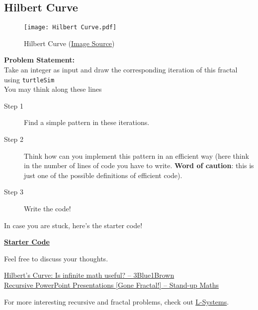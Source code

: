 \documentclass[../../Problems]{subfiles}
\begin{document}
\subsection{Hilbert Curve}{\label{pp:hilbertcurve}}
\begin{figure}[H]
	\centering
	\texttt{[image: Hilbert Curve.pdf]}
	\caption{Hilbert Curve (\href{https://www.cse.iitb.ac.in/~ranade/book.html}{Image Source})}
	\label{fig:hilbertcurve}
\end{figure}
\textbf{Problem Statement:}\\
Take an integer as input and draw the corresponding iteration of this fractal using \verb!turtleSim!\\
You may think along these lines
\begin{description}
	\item[Step 1]Find a simple pattern in these iterations.
	\item[Step 2]Think how can you implement this pattern in an efficient way (here think in the number of lines of code you have to write. \textbf{Word of caution}: this is just one of the possible definitions of efficient code).
	\item[Step 3]Write the code!
\end{description}
In case you are stuck, here's the starter code!
\begin{tcolorbox}%
	\href{https://github.com/paramrathour/CS-101/tree/main/Starter Codes/Hilbert Curve.cpp}{\textbf{Starter Code}}
\end{tcolorbox}
Feel free to discuss your thoughts.
\begin{funvideo}
\href{https://youtu.be/3s7h2MHQtxc}{Hilbert's Curve: Is infinite math useful? -- 3Blue1Brown}\\
\href{https://youtu.be/b-Fa6HtvGtQ}{Recursive PowerPoint Presentations [Gone Fractal!] -- Stand-up Maths}	
\end{funvideo}
For more interesting recursive and fractal problems, check out \hyperref[pp:lsystems]{L-Systems}.
\end{document}
